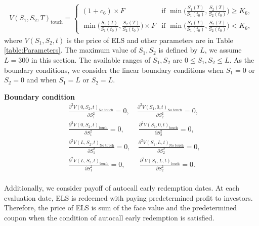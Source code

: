 \documentclass[11pt,reqno]{article}
\numberwithin{equation}{section}
\begin{document}
{\begin{equation*}
\begin{aligned}
    V(S_1,S_2,T)_{\text{touch}} = 
    \begin{cases}
    (1 + c_6) \times F
    & \mbox{if } 
    \min \bigg(\frac{S_1(T)}{S_1(t_0)}, \frac{S_2(T)}{S_2(t_0)}\bigg) 
    \ge K_6,  \\
    \min \bigg(\frac{S_1(T)}{S_1(t_0)}, \frac{S_2(T)}{S_2(t_0)}\bigg) \times F
    & \mbox{if } 
    \min \bigg(\frac{S_1(T)}{S_1(t_0)}, \frac{S_2(T)}{S_2(t_0)}\bigg) 
    < K_6,
    \end{cases}
\end{aligned}
\end{equation*}
where $V(S_1,S_2,t)$ is the price of ELS and other parameters are in Table \ref{table:Parameters}.
The maximum value of $S_1, S_2$ is defined by $L$, we assume $L = 300$ in this section.
The available ranges of $S_1, S_2$ are $0 \le S_1, S_2 \le L$. 
As the boundary conditions, we consider the linear boundary conditions when $S_1 = 0$ or $S_2 = 0$
 and when $S_1 = L$ or $S_2 = L$. 

\noindent \textbf{Boundary condition}
\begin{equation*}
\begin{aligned}
    & \frac{\partial^2 V(0,S_2,t)_{\text{No touch}}}{\partial S_1^2} = 0, 
    \quad \frac{\partial^2 V(S_1,0,t)_{\text{No touch}}}{\partial S_2^2} = 0, \\ 
    & \frac{\partial^2 V(0,S_2,t)_{\text{touch}}}{\partial S_1^2} = 0, 
    \qquad \frac{\partial^2 V(S_1,0,t)_{\text{touch}}}{\partial S_2^2} = 0,
    \\
    & \frac{\partial^2 V(L,S_2,t)_{\text{No touch}}}{\partial S_1^2} = 0, 
    \quad \frac{\partial^2 V(S_1,L,t)_{\text{No touch}}}{\partial S_2^2} = 0, \\ 
    & \frac{\partial^2 V(L,S_2,t)_{\text{touch}}}{\partial S_1^2} = 0, 
    \qquad \frac{\partial^2 V(S_1,L,t)_{\text{touch}}}{\partial S_2^2} = 0. \\
\end{aligned}
\end{equation*}

Additionally, we consider payoff of autocall early redemption dates. At each evaluation date, ELS is redeemed with paying predetermined profit to investors. Therefore, the price of ELS is sum of the face value and the predetermined coupon when the condition of autocall early redemption is satisfied.

}
\end{document}
